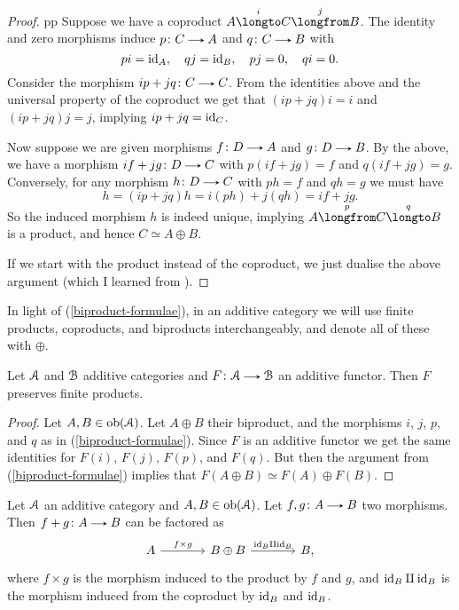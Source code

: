 \begin{proof}pp
  Suppose we have a coproduct $A \overset{i}{\longto} C
  \overset{j}{\longfrom} B$. The identity and zero morphisms induce $p
  \c C \to A$ and $q \c C \to B$ with
  \[
  pi = \mathrm{id}_A, \quad qj = \mathrm{id}_B, \quad pj = 0, \quad qi = 0.
  \]
  Consider the morphism $ip + jq \c C \to C$. From the identities above
  and the universal property of the coproduct we get that $(ip + jq)i
  = i$ and $(ip+jq)j = j$, implying $ip+jq = \mathrm{id}_C$.

  Now suppose we are given morphisms $f \c D \to A$ and $g \c D \to
  B$. By the above, we have a morphism $if + jg \c D \to C$ with
  $p(if+jg) = f$ and $q(if+jg) = g$. Conversely, for any morphism $h \c
  D \to C$ with $ph = f$ and $qh = g$ we must have
  \[
  h = (ip+jq)h = i(ph) + j(qh) = if + jg.
  \]
  So the induced morphism $h$ is indeed unique, implying $A
  \overset{p}{\longfrom} C \overset{q}{\longto} B$ is a product, and
  hence $C \simeq A \oplus B$.

  If we start with the product instead of the coproduct, we just
  dualise the above argument (which I learned from
  \cite{mo-additive-functor-direct-sum}).
\end{proof}


\begin{notation}
  In light of (\ref{biproduct-formulae}), in an additive category we
  will use finite products, coproducts, and biproducts
  interchangeably, and denote all of these with $\oplus$.
\end{notation}

\begin{lemma}
  \label{additive-functor-preserves-products}
  Let $\mathcal{A}$ and $\mathcal{B}$ additive categories and $F \c \A \to \B$ an
  additive functor. Then $F$ preserves finite products.
\end{lemma}

\begin{proof}
  Let $A,B \in \operatorname{ob}(\mathcal{A})$. Let $A \oplus B$ their biproduct, and the
  morphisms $i$, $j$, $p$, and $q$ as in
  (\ref{biproduct-formulae}). Since $F$ is an additive functor we get
  the same identities for $F(i)$, $F(j)$, $F(p)$, and $F(q)$.  But
  then the argument from (\ref{biproduct-formulae}) implies that $F(A
  \oplus B) \simeq F(A) \oplus F(B)$.
\end{proof}

\begin{lemma}
  \label{sum-factor}
  Let $\mathcal{A}$ an additive category and $A,B \in \operatorname{ob}(\mathcal{A})$. Let $f,g \c A
  \to B$ two morphisms. Then $f + g \c A \to B$ can be factored as
  \[
  \begin{tikzcd}[column sep = large]
    A \rar{f \times g} & B \oplus B \rar{\id_B \amalg \id_B} & B,
  \end{tikzcd}
  \]
  where $f \times g$ is the morphism induced to the product by $f$ and
  $g$, and $\mathrm{id}_B \amalg \mathrm{id}_B$ is the morphism induced from the
  coproduct by $\mathrm{id}_B$ and $\mathrm{id}_B$.
\end{lemma}

